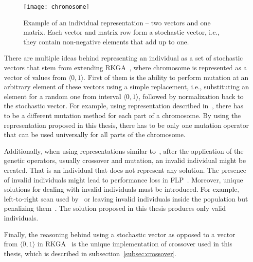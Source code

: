 \begin{figure}[htp]
    \texttt{[image: chromosome]}\caption[Example of an individual representation]{
        Example of an individual representation – two vectors and one matrix.
        Each vector and matrix row form a stochastic vector, i.e., they contain non-negative elements that add up to one.
    }
    \label{fig:chromosome}
\end{figure}

There are multiple ideas behind representing an individual as a set of stochastic vectors that stem
from extending RKGA~\cite{beanGeneticAlgorithmsRandom1994}, where chromosome is represented as a vector of values from $\langle0,1\rangle$.
First of them is the ability to perform mutation at an arbitrary element of these vectors using
a simple replacement, i.e., substituting an element for a random one from interval $\langle0,1 \rangle$,
followed by normalization back to the stochastic vector.
For example, using representation described in~\cite{friedrichIntegratedSlicingTree2018, riponAdaptiveVariableNeighborhood2013},
there has to be a different mutation method for each part of a chromosome.
By using the representation proposed in this thesis, there has to be only one mutation operator that can be used universally for all parts of the chromosome.

Additionally, when using representations similar to~\cite{friedrichIntegratedSlicingTree2018, riponAdaptiveVariableNeighborhood2013},
after the application of the genetic operators, usually crossover and mutation, an invalid individual might be created.
That is an individual that does not represent any solution.
The presence of invalid individuals might lead to performance loss in FLP~\cite{liuMultiimprovedGeneticAlgorithm2012}.
Moreover, unique solutions for dealing with invalid individuals must be introduced.
For example, left-to-right scan used by~\cite{hwangGeneticAlgorithmApproach2009, kandasamyEffectiveLocationMicro2020}
or leaving invalid individuals inside the population but penalizing them~\cite{hwangGeneticAlgorithmApproach2009}.
The solution proposed in this thesis produces only valid individuals.

Finally, the reasoning behind using a stochastic vector as opposed to a vector from $\langle0,1\rangle$ in RKGA~\cite{beanGeneticAlgorithmsRandom1994}
is the unique implementation of crossover used in this thesis, which is described in subsection~\ref{subsec:crossover}.
